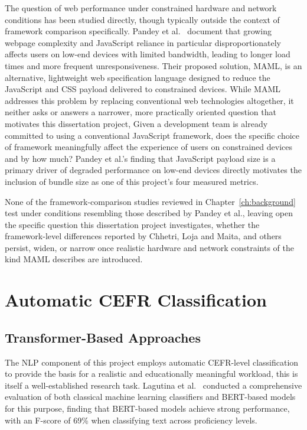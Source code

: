 \documentclass[11pt,a4paper]{report}
\begin{document}
The question of web performance under constrained hardware and network conditions has been studied directly, though typically outside the context of framework comparison specifically. Pandey et al.~\cite{maml} document that growing webpage complexity and JavaScript reliance in particular disproportionately affects users on low-end devices with limited bandwidth, leading to longer load times and more frequent unresponsiveness. Their proposed solution, MAML, is an alternative, lightweight web specification language designed to reduce the JavaScript and CSS payload delivered to constrained devices. While MAML addresses this problem by replacing conventional web technologies altogether, it neither asks or answers a narrower, more practically oriented question that motivates this dissertation project, Given a development team is already committed to using a conventional JavaScript framework, does the specific choice of framework meaningfully affect the experience of users on constrained devices and by how much? Pandey et al.'s finding  
that JavaScript payload size is a primary driver of degraded performance on low-end devices directly motivates the inclusion of bundle size as one of this project's four measured metrics. 

\vspace{5mm}

None of the framework-comparison studies reviewed in Chapter~\ref{ch:background} test under conditions resembling those described by Pandey et al., leaving open the specific question this dissertation project investigates, whether the framework-level differences reported by Chhetri, Loja and Maita, and others persist, widen, or narrow once realistic hardware and network constraints of the kind MAML describes are introduced.

\section{Automatic CEFR Classification}

\subsection{Transformer-Based Approaches}

The NLP component of this project employs automatic CEFR-level classification to provide the basis for a realistic and educationally meaningful workload, this is itself a well-established research task. Lagutina et
al.~\cite{cefr-ml} conducted a comprehensive evaluation of both classical machine learning classifiers and BERT-based models for this purpose, finding that BERT-based models achieve strong performance, with an F-score of 69\% when
classifying text across proficiency levels.
\end{document}
